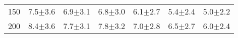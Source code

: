 \begin{tabular}{lllllll}
150 & {\cellcolor[HTML]{F2F2F2}} \color[HTML]{000000} 7.5$\pm$3.6 & {\cellcolor[HTML]{F6F6F6}} \color[HTML]{000000} 6.9$\pm$3.1 & {\cellcolor[HTML]{F6F6F6}} \color[HTML]{000000} 6.8$\pm$3.0 & {\cellcolor[HTML]{F8F8F8}} \color[HTML]{000000} 6.1$\pm$2.7 & {\cellcolor[HTML]{F6F6F6}} \color[HTML]{000000} 5.4$\pm$2.4 & {\cellcolor[HTML]{F9F9F9}} \color[HTML]{000000} 5.0$\pm$2.2 \\
200 & {\cellcolor[HTML]{FBFBFB}} \color[HTML]{000000} 8.4$\pm$3.6 & {\cellcolor[HTML]{FEFEFE}} \color[HTML]{000000} 7.7$\pm$3.1 & {\cellcolor[HTML]{FDFDFD}} \color[HTML]{000000} 7.8$\pm$3.2 & {\cellcolor[HTML]{FEFEFE}} \color[HTML]{000000} 7.0$\pm$2.8 & {\cellcolor[HTML]{FEFEFE}} \color[HTML]{000000} 6.5$\pm$2.7 & {\cellcolor[HTML]{FFFFFF}} \color[HTML]{000000} 6.0$\pm$2.4 \\
\end{tabular}
